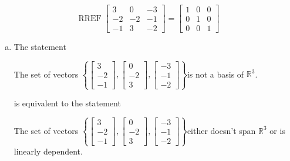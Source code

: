 \begin{exerciseAnswer} 


\[\operatorname{RREF} \left[\begin{array}{ccc}
3 & 0 & -3 \\
-2 & -2 & -1 \\
-1 & 3 & -2
\end{array}\right] = \left[\begin{array}{ccc}
1 & 0 & 0 \\
0 & 1 & 0 \\
0 & 0 & 1
\end{array}\right] \]


\begin{enumerate}[(a)]
\item The statement 
\begin{center}\begin{minipage}{0.8\textwidth}
 The set of vectors \( \left\{ \left[\begin{array}{c}
3 \\
-2 \\
-1
\end{array}\right] , \left[\begin{array}{c}
0 \\
-2 \\
3
\end{array}\right] , \left[\begin{array}{c}
-3 \\
-1 \\
-2
\end{array}\right] \right\} \)is not a basis of \(\mathbb{R}^3\). 
\end{minipage}\end{center}
     is equivalent to the statement 
\begin{center}\begin{minipage}{0.8\textwidth}
 The set of vectors \( \left\{ \left[\begin{array}{c}
3 \\
-2 \\
-1
\end{array}\right] , \left[\begin{array}{c}
0 \\
-2 \\
3
\end{array}\right] , \left[\begin{array}{c}
-3 \\
-1 \\
-2
\end{array}\right] \right\} \)either doesn't span \(\mathbb{R}^3\) or is linearly dependent.
\end{minipage}\end{center}
    

\end{enumerate}
\end{exerciseAnswer}
